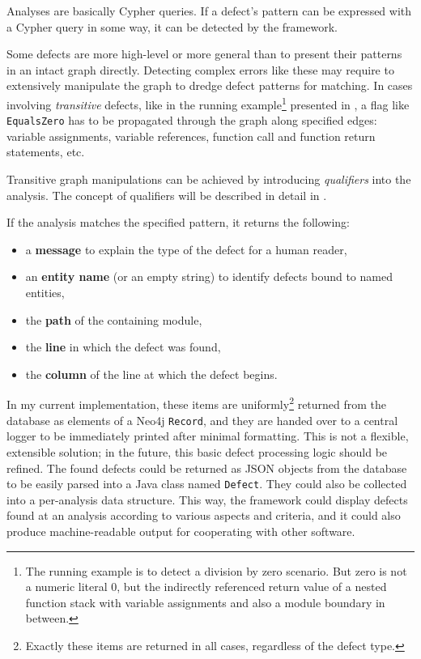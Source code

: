 Analyses are basically Cypher queries. If a defect's pattern can be expressed with a Cypher query in some way, it can be detected by the framework.

Some defects are more high-level or more general than to present their patterns in an intact graph directly. Detecting complex errors like these may require to extensively manipulate the graph to dredge defect patterns for matching. In cases involving \emph{transitive} defects, like in the running example\footnote{The running example is to detect a division by zero scenario. But zero is not a numeric literal $0$, but the indirectly referenced return value of a nested function stack with variable assignments and also a module boundary in between.} presented in , a flag like \texttt{EqualsZero} has to be propagated through the graph along specified edges: variable assignments, variable references, function call and function return statements, etc.

Transitive graph manipulations can be achieved by introducing \emph{qualifiers} into the analysis. The concept of qualifiers will be described in detail in .

If the analysis matches the specified pattern, it returns the following:

\begin{itemize}
\item a \textbf{message} to explain the type of the defect for a human reader,
\item an \textbf{entity name} (or an empty string) to identify defects bound to named entities,
\item the \textbf{path} of the containing module,
\item the \textbf{line} in which the defect was found,
\item the \textbf{column} of the line at which the defect begins.
\end{itemize}

In my current implementation, these items are uniformly\footnote{Exactly these items are returned in all cases, regardless of the defect type.} returned from the database as elements of a Neo4j \texttt{Record}, and they are handed over to a central logger to be immediately printed after minimal formatting. This is not a flexible, extensible solution; in the future, this basic defect processing logic should be refined. The found defects could be returned as JSON objects from the database to be easily parsed into a Java class named \texttt{Defect}. They could also be collected into a per-analysis data structure. This way, the framework could display defects found at an analysis according to various aspects and criteria, and it could also produce machine-readable output for cooperating with other software.


